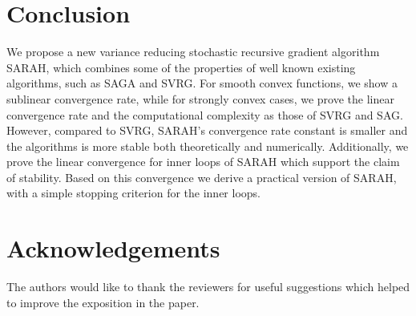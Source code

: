 \documentclass{article}
\begin{document}

\section{Conclusion}
We propose a new variance reducing stochastic recursive gradient algorithm SARAH, which combines some of the properties of well known existing algorithms, such as SAGA and SVRG.   For smooth convex functions, we show a sublinear convergence rate, while for strongly convex cases, we prove the linear convergence rate and the  computational complexity as those of SVRG and SAG. However, compared to SVRG, SARAH's convergence rate constant is smaller and the algorithms is  more stable both theoretically and numerically. Additionally, we prove the linear convergence for inner loops of SARAH which support the claim of stability. Based on this convergence we derive a practical version of SARAH, with a simple stopping criterion for the inner loops. 





\section*{Acknowledgements} 
The authors would like to thank the reviewers for useful suggestions which helped to improve the exposition in the paper. 

% 
%








\end{document}
